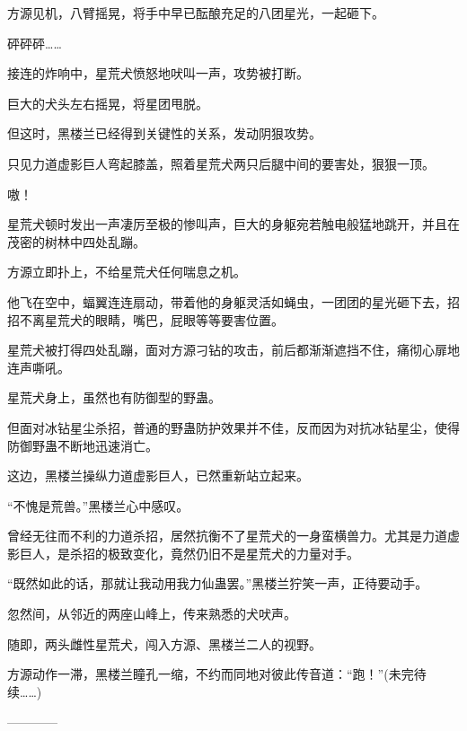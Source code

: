 \begin{this_body}
方源见机，八臂摇晃，将手中早已酝酿充足的八团星光，一起砸下。

砰砰砰……

接连的炸响中，星荒犬愤怒地吠叫一声，攻势被打断。

巨大的犬头左右摇晃，将星团甩脱。

但这时，黑楼兰已经得到关键性的关系，发动阴狠攻势。

只见力道虚影巨人弯起膝盖，照着星荒犬两只后腿中间的要害处，狠狠一顶。

嗷！

星荒犬顿时发出一声凄厉至极的惨叫声，巨大的身躯宛若触电般猛地跳开，并且在茂密的树林中四处乱蹦。

方源立即扑上，不给星荒犬任何喘息之机。

他飞在空中，蝠翼连连扇动，带着他的身躯灵活如蝇虫，一团团的星光砸下去，招招不离星荒犬的眼睛，嘴巴，屁眼等等要害位置。

星荒犬被打得四处乱蹦，面对方源刁钻的攻击，前后都渐渐遮挡不住，痛彻心扉地连声嘶吼。

星荒犬身上，虽然也有防御型的野蛊。

但面对冰钻星尘杀招，普通的野蛊防护效果并不佳，反而因为对抗冰钻星尘，使得防御野蛊不断地迅速消亡。

这边，黑楼兰操纵力道虚影巨人，已然重新站立起来。

“不愧是荒兽。”黑楼兰心中感叹。

曾经无往而不利的力道杀招，居然抗衡不了星荒犬的一身蛮横兽力。尤其是力道虚影巨人，是杀招的极致变化，竟然仍旧不是星荒犬的力量对手。

“既然如此的话，那就让我动用我力仙蛊罢。”黑楼兰狞笑一声，正待要动手。

忽然间，从邻近的两座山峰上，传来熟悉的犬吠声。

随即，两头雌性星荒犬，闯入方源、黑楼兰二人的视野。

方源动作一滞，黑楼兰瞳孔一缩，不约而同地对彼此传音道：“跑！”(未完待续……)

------------

\end{this_body}

